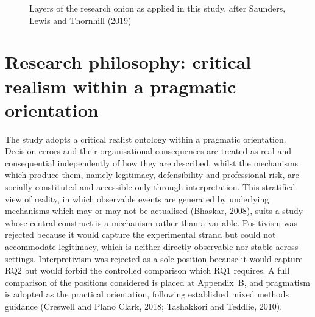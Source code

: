 \documentclass[12pt,a4paper]{article}
\begin{document}
\begin{figure}[H]
\centering
{}
\caption{Layers of the research onion as applied in this study, after Saunders, Lewis and Thornhill (2019)}
\label{fig:onion}
\end{figure}

\section{Research philosophy: critical realism within a pragmatic orientation}

The study adopts a critical realist ontology within a pragmatic orientation. Decision errors and
their organisational consequences are treated as real and consequential independently of how they
are described, whilst the mechanisms which produce them, namely legitimacy, defensibility and
professional risk, are socially constituted and accessible only through interpretation. This
stratified view of reality, in which observable events are generated by underlying mechanisms
which may or may not be actualised (Bhaskar, 2008), suits a study whose central construct is a mechanism rather than a variable. Positivism was
rejected because it would capture the experimental strand but could not accommodate legitimacy,
which is neither directly observable nor stable across settings. Interpretivism was rejected as a
sole position because it would capture RQ2 but would forbid the controlled comparison which RQ1
requires. A full comparison of the positions considered is placed at Appendix~B, and pragmatism is
adopted as the practical orientation, following established mixed methods guidance (Creswell and
Plano Clark, 2018; Tashakkori and Teddlie, 2010).
\end{document}
